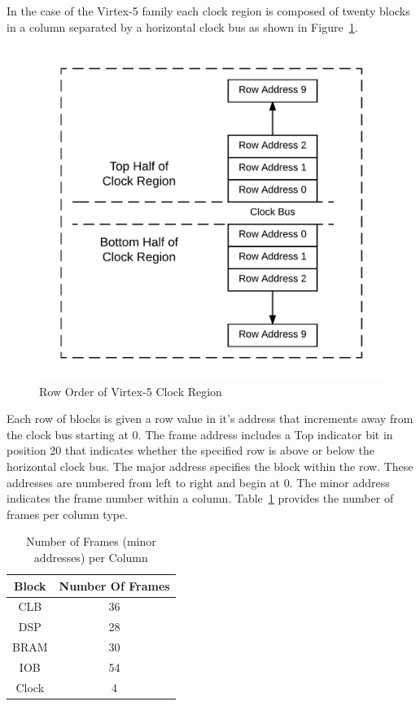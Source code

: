 In the case of the Virtex-5 family each clock region is composed of twenty blocks in a column separated by a horizontal clock bus as shown in Figure~\ref{fig:RowOrder}.
\begin{figure}[h]
\centering
\includegraphics[width=.7\linewidth]{Figures/RowOrder}
\caption[Row Order of Virtex-5 Clock Region]{Row Order of Virtex-5 Clock Region}
\label{fig:RowOrder}
\end{figure}
Each row of blocks is given a row value in it's address that increments away from the clock bus starting at 0. 
The frame address includes a Top indicator bit in position 20 that indicates whether the specified row is above or below the horizontal clock bus.
The major address specifies the block within the row.
These addresses are numbered from left to right and begin at 0.
The minor address indicates the frame number within a column. 
Table~\ref{tbl:minorAddressNumbers} provides the number of frames per column type.
\begin{table}[]
	\centering
	\caption{Number of Frames (minor addresses) per Column}
	\label{tbl:minorAddressNumbers}
	\begin{tabular}{|c|c|}
		\hline
		Block             & Number Of Frames \\ \hline
		CLB               & 36               \\ \hline
		DSP               & 28               \\ \hline
		\acrshort{BRAM} & 30               \\ \hline
		IOB               & 54               \\ \hline
		Clock             & 4                \\ \hline
	\end{tabular}
\end{table}
